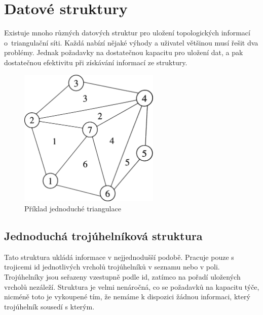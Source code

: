 \documentclass[12pt,a4paper]{article}
\begin{document}
\newpage
\section{Datové struktury}
\label{sec:data_struct}

Existuje mnoho různých datových struktur pro uložení topologických
informací o~triangulační síti. Každá nabízí nějaké výhody a uživatel
většinou musí řešit dva problémy. Jednak požadavky na dostatečnou
kapacitu pro uložení dat, a pak dostatečnou efektivitu při získávání
informací ze struktury.

\begin{figure}[h!]
\centering
\includegraphics[width=0.6\textwidth]{img/data_struct.png}
\caption{Příklad jednoduché triangulace}
\label{fig:struct_triangulace}
\end{figure}

\newpage
\subsection{Jednoduchá trojúhelníková struktura}

Tato struktura ukládá informace v nejjednodušší podobě. Pracuje pouze
s trojicemi id jednotlivých vrcholů trojúhelníků v seznamu nebo v
poli. Trojúhelníky jsou seřazeny vzestupně podle id, zatímco na pořadí
uložených vrcholů nezáleží. Struktura je velmi nenáročná, co se
požadavků na kapacitu týče, nicméně toto je vykoupené tím, že nemáme k
dispozici žádnou informaci, který trojúhelník sousedí s kterým.
\end{document}
